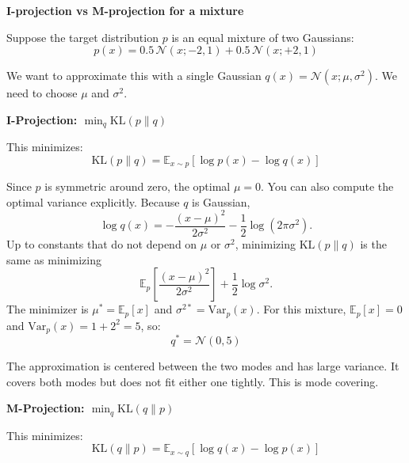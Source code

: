 \begin{examplebox}
\textbf{I-projection vs M-projection for a mixture}

\vspace{0.5em}

Suppose the target distribution $p$ is an equal mixture of two Gaussians:
\begin{equation*}
p(x) = 0.5 \, \mathcal{N}(x; -2, 1) + 0.5 \, \mathcal{N}(x; +2, 1)
\end{equation*}

We want to approximate this with a single Gaussian $q(x) = \mathcal{N}(x; \mu, \sigma^2)$. We need to choose $\mu$ and $\sigma^2$.

\vspace{0.5em}

\textbf{I-Projection: $\min_q \text{KL}(p \| q)$}

This minimizes:
\begin{equation*}
\text{KL}(p \| q) = \mathbb{E}_{x \sim p}[\log p(x) - \log q(x)]
\end{equation*}

Since $p$ is symmetric around zero, the optimal $\mu = 0$. You can also compute the optimal variance explicitly. Because $q$ is Gaussian,
\begin{equation*}
\log q(x) = -\frac{(x-\mu)^2}{2\sigma^2} - \frac{1}{2}\log(2\pi\sigma^2).
\end{equation*}
Up to constants that do not depend on $\mu$ or $\sigma^2$, minimizing $\text{KL}(p\|q)$ is the same as minimizing
\begin{equation*}
\mathbb{E}_{p}\!\left[\frac{(x-\mu)^2}{2\sigma^2}\right] + \frac{1}{2}\log \sigma^2.
\end{equation*}
The minimizer is $\mu^*=\mathbb{E}_{p}[x]$ and $\sigma^{2*}=\mathrm{Var}_{p}(x)$. For this mixture, $\mathbb{E}_{p}[x]=0$ and $\mathrm{Var}_{p}(x)=1+2^2=5$, so:
\begin{equation*}
q^* = \mathcal{N}(0, 5)
\end{equation*}

The approximation is centered between the two modes and has large variance. It covers both modes but does not fit either one tightly. This is mode covering.

\vspace{0.5em}

\textbf{M-Projection: $\min_q \text{KL}(q \| p)$}

This minimizes:
\begin{equation*}
\text{KL}(q \| p) = \mathbb{E}_{x \sim q}[\log q(x) - \log p(x)]
\end{equation*}


\end{examplebox}
